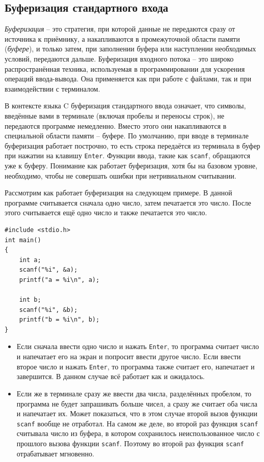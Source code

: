 \documentclass{article}
\begin{document}
\subsection*{Буферизация стандартного входа}
\textit{Буферизация} -- это стратегия, при которой данные не передаются сразу от источника к приёмнику, а накапливаются в промежуточной области памяти (\textit{буфере}), и только затем, при заполнении буфера или наступлении необходимых условий, передаются дальше. Буферизация входного потока -- это широко распространённая техника, используемая в программировании для ускорения операций ввода-вывода. Она применяется как при работе с файлами, так и при взаимодействии с терминалом.

В контексте языка C буферизация стандартного ввода означает, что символы, введённые вами в терминале (включая пробелы и переносы строк), не передаются программе немедленно. Вместо этого они накапливаются в специальной области памяти -- буфере. По умолчанию, при вводе в терминале буферизация работает построчно, то есть строка передаётся из терминала в буфер при нажатии на клавишу \texttt{Enter}. Функции ввода, такие как \texttt{scanf}, обращаются уже к буферу.
Понимание как работает буферизация, хотя бы на базовом уровне, необходимо, чтобы не совершать ошибки при нетривиальном считывании.


Рассмотрим как работает буферизация на следующем примере. В данной программе считывается сначала одно число, затем печатается это число. После этого считывается ещё одно число и также печатается это число.
\begin{lstlisting}
#include <stdio.h>
int main()
{
	int a;
    scanf("%i", &a);
    printf("a = %i\n", a);

	int b;
    scanf("%i", &b);
    printf("b = %i\n", b);
}
\end{lstlisting}
\begin{itemize}
\item Если сначала ввести одно число и нажать \texttt{Enter}, то программа считает число и напечатает его на экран и попросит ввести другое число. Если ввести второе число и нажать \texttt{Enter}, то программа также считает его, напечатает и завершится. В данном случае всё работает как и ожидалось.
\item Если же в терминале сразу же ввести два числа, разделённых пробелом, то программа не будет запрашивать больше чисел, а сразу же считает оба числа и напечатает их. Может показаться, что в этом случае второй вызов функции \texttt{scanf} вообще не отработал. На самом же деле, во второй раз функция \texttt{scanf} считывала число из буфера, в котором сохранилось неиспользованное число с прошлого вызова функции \texttt{scanf}. Поэтому во второй раз функция \texttt{scanf} отрабатывает мгновенно.
\end{itemize}
\end{document}
